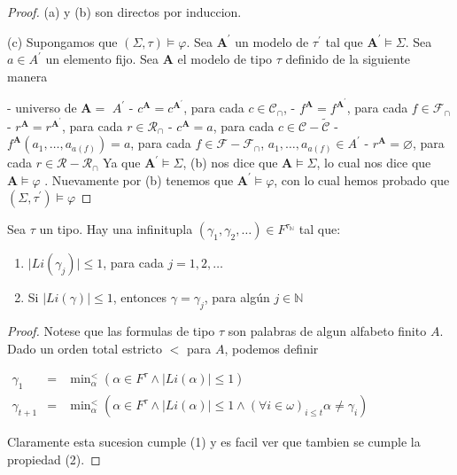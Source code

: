   \begin{proof}
    (a) y (b) son directos por induccion.

    (c) Supongamos que $(\Sigma, \tau)\models \varphi $. Sea $\mathbf{A} ^{\prime}$ un modelo de $\tau ^{\prime}$ tal que $\mathbf{A}^{\prime}\models \Sigma $. Sea $a\in A^{\prime}$ un elemento fijo. Sea $\mathbf{A}$ el modelo de tipo $\tau $ definido de la siguiente manera

    - universo de $\mathbf{A}=$ $A^{\prime}$
    - $c^{\mathbf{A}}=c^{\mathbf{A}^{\prime}}$, para cada $c\in \mathcal{ C}_{\cap }$,
    - $f^{\mathbf{A}}=f^{\mathbf{A}^{\prime}}$, para cada $f\in \mathcal{ F}_{\cap }$
    - $r^{\mathbf{A}}=r^{\mathbf{A}^{\prime}}$, para cada $r\in \mathcal{ R}_{\cap }$
    - $c^{\mathbf{A}}=a$, para cada $c\in \mathcal{C}-\widetilde{\mathcal{ C}}$
    - $f^{\mathbf{A}}(a_{1}, \dotsc, a_{a(f)})=a$, para cada $f\in \mathcal{F}- \mathcal{F}_{\cap }$, $a_{1}, \dotsc, a_{a(f)}\in A^{\prime}$
    - $r^{\mathbf{A}}=\varnothing $, para cada $r\in \mathcal{R-R}_{\cap }$
    Ya que $\mathbf{A}^{\prime}\models \Sigma $, (b) nos dice que $ \mathbf{A}\models \Sigma $, lo cual nos dice que $\mathbf{A}\models \varphi $ . Nuevamente por (b) tenemos que $\mathbf{A}^{\prime}\models \varphi $, con lo cual hemos probado que $(\Sigma ,\tau ^{\prime})\models \varphi $
  \end{proof}

  \begin{lemma}
    \PN Sea $\tau$ un tipo. Hay una infinitupla $(\gamma_{1}, \gamma_{2}, \dotsc) \in F^{\tau_{\mathbb{N}}}$ tal que:
    \begin{enumerate}
      \item $\lvert Li(\gamma_{j}) \rvert \leq 1$, para cada $j = 1, 2, \dotsc$
      \item Si $\lvert Li(\gamma )\rvert \leq 1$, entonces $\gamma = \gamma_{j}$, para algún $j \in \mathbb{N}$
    \end{enumerate}
  \end{lemma}
  \begin{proof}
    Notese que las formulas de tipo $\tau $ son palabras de algun alfabeto finito $A$. Dado un orden total estricto $< $ para $A$, podemos definir

    $\displaystyle \begin{array}{rcl} \gamma _{1} & =& \min\nolimits_{\alpha }^{< }\left( \alpha \in F^{\tau }\wedge \lvert Li(\alpha )\rvert \leq 1\right) \\ \gamma _{t+1} & =& \min\nolimits_{\alpha }^{< }\left( \alpha \in F^{\tau }\wedge \lvert Li(\alpha )\rvert \leq 1\wedge (\forall i\in \omega )_{i\leq t}\alpha \neq \gamma _{i}\right) \end{array} $

    Claramente esta sucesion cumple (1) y es facil ver que tambien se cumple la propiedad (2).
  \end{proof}

